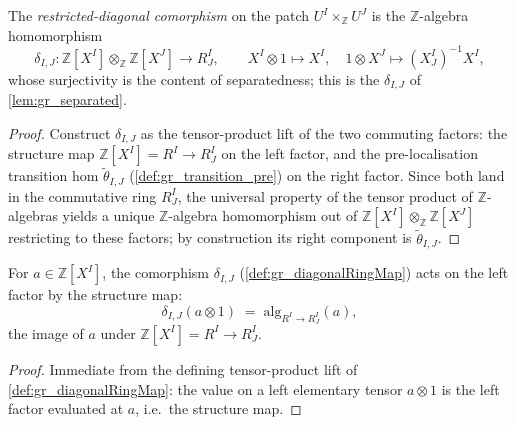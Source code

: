 \begin{definition}\leanok
  \label{def:gr_diagonalRingMap}
  The \emph{restricted-diagonal comorphism} on the patch \(U^I \times_{\mathbb{Z}}
  U^J\) is the \(\mathbb{Z}\)-algebra homomorphism
  \[
    \delta_{I,J} : \mathbb{Z}[X^I] \otimes_{\mathbb{Z}} \mathbb{Z}[X^J]
    \longrightarrow R^I_J,
    \qquad
    X^I \otimes 1 \mapsto X^I, \quad
    1 \otimes X^J \mapsto (X^I_J)^{-1} X^I,
  \]
  whose surjectivity is the content of separatedness; this is the \(\delta_{I,J}\)
  of \cref{lem:gr_separated}.
\end{definition}
\begin{proof}
  \leanok
  Construct \(\delta_{I,J}\) as the tensor-product lift of the two commuting
  factors: the structure map \(\mathbb{Z}[X^I] = R^I \to R^I_J\) on the left
  factor, and the pre-localisation transition hom \(\tilde\theta_{I,J}\)
  (\cref{def:gr_transition_pre}) on the right factor. Since both land in the
  commutative ring \(R^I_J\), the universal property of the tensor product of
  \(\mathbb{Z}\)-algebras yields a unique \(\mathbb{Z}\)-algebra homomorphism out
  of \(\mathbb{Z}[X^I] \otimes_{\mathbb{Z}} \mathbb{Z}[X^J]\) restricting to these
  factors; by construction its right component is \(\tilde\theta_{I,J}\).
\end{proof}

\begin{lemma}\leanok
  \label{lem:gr_diagonalRingMap_left}
  For \(a \in \mathbb{Z}[X^I]\), the comorphism \(\delta_{I,J}\)
  (\cref{def:gr_diagonalRingMap}) acts on the left factor by the structure map:
  \[
    \delta_{I,J}(a \otimes 1) \;=\; \mathrm{alg}_{R^I \to R^I_J}(a),
  \]
  the image of \(a\) under \(\mathbb{Z}[X^I] = R^I \to R^I_J\).
\end{lemma}
\begin{proof}
  \leanok
  Immediate from the defining tensor-product lift of
  \cref{def:gr_diagonalRingMap}: the value on a left elementary tensor \(a \otimes
  1\) is the left factor evaluated at \(a\), i.e.\ the structure map.
\end{proof}

